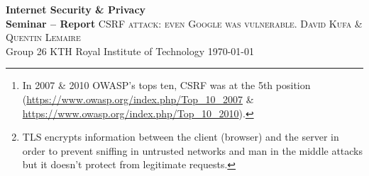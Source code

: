 \documentclass[a4paper,11pt,openany]{report}
\newcommand{\csrf}{\textit{Cross-Site Request Forgery}}
\begin{document}
 \begin{titlepage}
  \centering
  \vfill
    {\bfseries\Large{
	Internet Security \& Privacy\\
	Seminar -- Report}
    }    
  \vfill
  \vfill
    \Huge{\textsc{CSRF attack: even Google was vulnerable.}}
  \vfill
      \Large{\textsc{David Kufa} \& \textsc{Quentin Lemaire}}
    \\
  \vspace{0.4cm}
    Group 26
  \vfill
  \vfill
    KTH Royal Institute of Technology
  \vfill
    \today
\end{titlepage}

\begin{abstract}
  \csrf{} (CSRF) -- often spelled ``sea surf'' -- is a well-known web attack which has 
  been discovered in 2001. The \textit{Open Web Application Security Project} (OWASP \cite{owasp}) 
  ranked CSRF as the 8th\footnote{In 2007 \& 2010 OWASP's tops ten, CSRF was at the 5th position 
  (\url{https://www.owasp.org/index.php/Top_10_2007} \& \url{https://www.owasp.org/index.php/Top_10_2010}).} 
  vulnerability in the top 10 of the most critical web application security risks in 2013~\cite{owasp_top_ten}.
  
  CSRF attack consists in creating (forging) fake HTTP or HTTPS\footnote{TLS encrypts 
  information between the client (browser) and the server in order to prevent sniffing 
  in untrusted networks and man in the middle attacks but it doesn't protect from 
  legitimate requests.} requests on the user's behalf. It utilizes the lack of knowledge 
  of the victim to build the request and get information with their credentials (as if 
  the user really wanted to execute this request). In order to succeed, the victim must 
  be connected (authenticated) to the service (website) where there is the vulnerability. 
  Then, an attacker will have to fool the victim in order to build the fake request (with 
  social engineering for instance).
  
  During this seminar, we wanted to get a better understanding of the security breaches 
  involved in CSRF attack. The most interesting part consisted in the comprehension of 
  the surface of attack, how this attack can be done and where does it come from. It 
  was also important to understand what kind of information an attacker could steal or 
  affect on the user's behalf thanks to this attack. Furthermore, it was relevant to study 
  different ways of detecting the vulnerability and how to protect web servers from this 
  attack.
  

\end{abstract}
\end{document}
